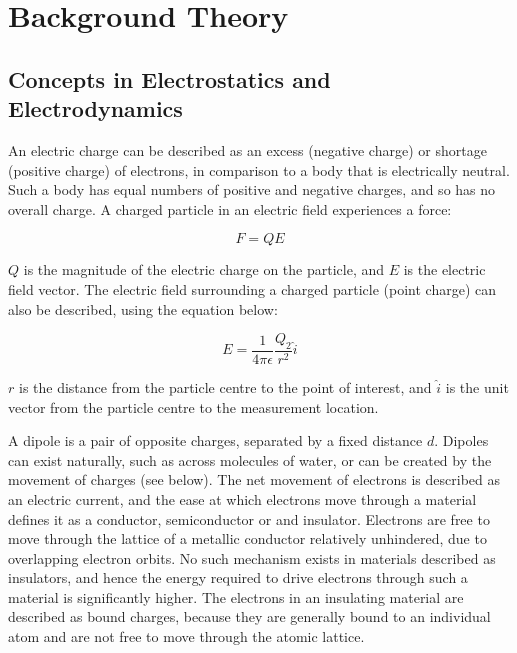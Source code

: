 \chapter{Background Theory}
\label{Chapter:Background}

\section{Concepts in Electrostatics and Electrodynamics}
\label{sec:concepts_in_electrostatics_and_electrodynamics}

An electric charge can be described as an excess (negative charge) or shortage (positive charge) of electrons, in comparison to a body that is electrically neutral. Such a body has equal numbers of positive and negative charges, and so has no overall charge. A charged particle in an electric field experiences a force:

\begin{equation}
 F=QE
\label{eqn:force_on_point_charge}
\end{equation}

$Q$ is the magnitude of the electric charge on the particle, and $E$ is the electric field vector. The electric field surrounding a charged particle (point charge) can also be described, using the equation below:

\begin{equation}
 E=\dfrac{1}{4\pi\epsilon}\dfrac{Q_{2}}{r^{2}}\hat{i}
\label{eqn:field_around_point_charge}
\end{equation}

$r$ is the distance from the particle centre to the point of interest, and $\hat{i}$ is the unit vector from the particle centre to the measurement location.

A dipole is a pair of opposite charges, separated by a fixed distance $d$. Dipoles can exist naturally, such as across molecules of water, or can be created by the movement of charges (see below). The net movement of electrons is described as an electric current, and the ease at which electrons move through a material defines it as a conductor, semiconductor or and insulator. Electrons are free to move through the lattice of a metallic conductor relatively unhindered, due to overlapping electron orbits. No such mechanism exists in materials described as insulators, and hence the energy required to drive electrons through such a material is significantly higher. The electrons in an insulating material are described as bound charges, because they are generally bound to an individual atom and are not free to move through the atomic lattice.


